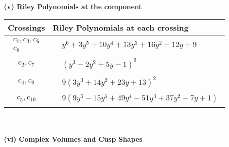 \documentclass[1p]{elsarticle_modified}
\theoremstyle{definition}
\begin{document}
\newpage\renewcommand{\arraystretch}{1}
\flushleft \textbf{(v) Riley Polynomials at the component}\newline \\
\begin{tabular}{m{50pt}|m{274pt}}
Crossings & \hspace{64pt}Riley Polynomials at each crossing \\
\hline $$\begin{aligned}c_{1},c_{3},c_{6}\\c_{8}\end{aligned}$$&$\begin{aligned}
&y^6+3 y^5+10 y^4+13 y^3+16 y^2+12 y+9
\end{aligned}$\\
\hline $$\begin{aligned}c_{2},c_{7}\end{aligned}$$&$\begin{aligned}
&(y^3-2 y^2+5 y-1)^2
\end{aligned}$\\
\hline $$\begin{aligned}c_{4},c_{9}\end{aligned}$$&$\begin{aligned}
&9(3 y^3+14 y^2+23 y+13)^2
\end{aligned}$\\
\hline $$\begin{aligned}c_{5},c_{10}\end{aligned}$$&$\begin{aligned}
&9(9 y^6-15 y^5+49 y^4-51 y^3+37 y^2-7 y+1)
\end{aligned}$\\
\hline
\end{tabular}\\~\\
\newpage\flushleft \textbf{(vi) Complex Volumes and Cusp Shapes}
\end{document}
